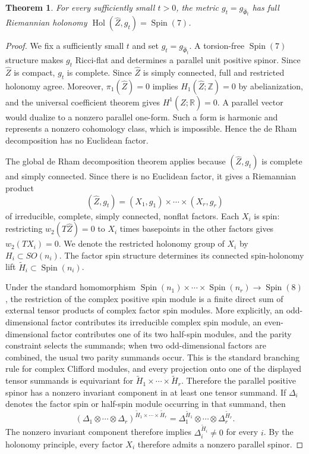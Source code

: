 \documentclass[11pt]{article}
\newtheorem{theorem}{Theorem}[section]
\theoremstyle{remark}\newtheorem{remark}[theorem]{Remark}
\newcommand{\SpinSeven}{\operatorname{Spin}(7)}
\newcommand{\Hol}{\operatorname{Hol}}
\newcommand{\R}{\mathbb R}
\newcommand{\Z}{\mathbb Z}
\begin{document}
\begin{theorem}\label{thm:full-holonomy}
For every sufficiently small $t>0$, the metric
$g_t=g_{\widehat\Phi_t}$ has full Riemannian holonomy
$\Hol(\widehat Z,g_t)=\SpinSeven$.
\end{theorem}
\begin{proof}
We fix a sufficiently small $t$ and set $g_t=g_{\widehat\Phi_t}$.  A
torsion-free $\SpinSeven$ structure makes $g_t$ Ricci-flat and determines a
parallel unit positive spinor.
Since $\widehat Z$ is compact, $g_t$ is complete.  Since $\widehat Z$ is
simply connected, full and restricted holonomy agree.  Moreover,
$\pi_1(\widehat Z)=0$ implies $H_1(\widehat Z;\Z)=0$ by abelianization,
and the universal coefficient theorem gives
$H^1(\widehat Z;\R)=0$.  A parallel vector would dualize to a nonzero
parallel one-form.  Such a form is harmonic and represents a nonzero
cohomology class, which is impossible.  Hence the de Rham decomposition
has no Euclidean factor.

The global de Rham decomposition theorem applies because
$(\widehat Z,g_t)$ is complete and simply connected.  Since there is no
Euclidean factor, it gives a Riemannian product
\[
 (\widehat Z,g_t)=(X_1,g_1)\times\cdots\times(X_r,g_r)
\]
of irreducible, complete, simply connected, nonflat factors.  Each $X_i$
is spin: restricting $w_2(T\widehat Z)=0$ to $X_i$ times basepoints in the
other factors gives $w_2(TX_i)=0$.  We denote the restricted
holonomy group of $X_i$ by $H_i\subset SO(n_i)$.  The factor spin
structure determines its connected spin-holonomy lift
$\widetilde H_i\subset\operatorname{Spin}(n_i)$.

Under the standard homomorphism
$\operatorname{Spin}(n_1)\times\cdots\times\operatorname{Spin}(n_r)
\to\operatorname{Spin}(8)$, the restriction of
the complex positive spin module is a finite direct sum of external
tensor products of complex factor spin modules.  More explicitly, an
odd-dimensional factor contributes its irreducible complex spin module,
an even-dimensional factor contributes one of its two half-spin modules,
and the parity constraint selects the summands; when two odd-dimensional
factors are combined, the usual two parity summands occur.  This is the
standard branching rule for complex Clifford modules, and every projection
onto one of the displayed tensor summands is equivariant for
$\widetilde H_1\times\cdots\times\widetilde H_r$.
Therefore the parallel positive spinor has a nonzero invariant component
in at least one tensor summand.  If $\Delta_i$ denotes the factor spin or
half-spin module occurring in that summand, then
\[
 (\Delta_1\otimes\cdots\otimes\Delta_r)
 ^{\widetilde H_1\times\cdots\times\widetilde H_r}
 =\Delta_1^{\widetilde H_1}\otimes\cdots\otimes
   \Delta_r^{\widetilde H_r}.
\]
The nonzero invariant component therefore implies
$\Delta_i^{\widetilde H_i}\ne0$ for every $i$.  By the holonomy
principle, every factor $X_i$ therefore admits a nonzero parallel spinor.


\end{proof}
\end{document}
